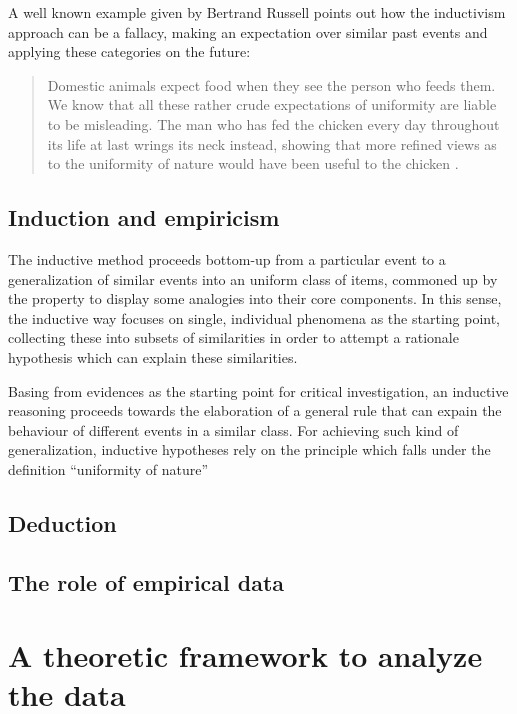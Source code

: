 \documentclass[a4paper,twoside,12pt,chapterprefix=false,bibliography=totocnumbered,listof=flat]{scrbook}
\begin{document}
A well known example given by Bertrand Russell points out how the
inductivism approach can be a fallacy, making an expectation over
similar past events and applying these categories on the future:

\begin{quote}
Domestic animals expect food when they see the person who feeds them. We
know that all these rather crude expectations of uniformity are liable
to be misleading. The man who has fed the chicken every day throughout
its life at last wrings its neck instead, showing that more refined
views as to the uniformity of nature would have been useful to the
chicken \citep{russellProblems}.
\end{quote}

\subsection{Induction and empiricism}\label{induction-and-empiricism}

The inductive method proceeds bottom-up from a particular event to a
generalization of similar events into an uniform class of items,
commoned up by the property to display some analogies into their core
components. In this sense, the inductive way focuses on single,
individual phenomena as the starting point, collecting these into
subsets of similarities in order to attempt a rationale hypothesis which
can explain these similarities.

Basing from evidences as the starting point for critical investigation,
an inductive reasoning proceeds towards the elaboration of a general
rule that can expain the behaviour of different events in a similar
class. For achieving such kind of generalization, inductive hypotheses
rely on the principle which falls under the definition
\enquote{uniformity of nature}

\subsection{Deduction}\label{deduction}

\subsection{The role of empirical
data}\label{the-role-of-empirical-data}

\section{A theoretic framework to analyze the
data}\label{a-theoretic-framework-to-analyze-the-data}
\end{document}
